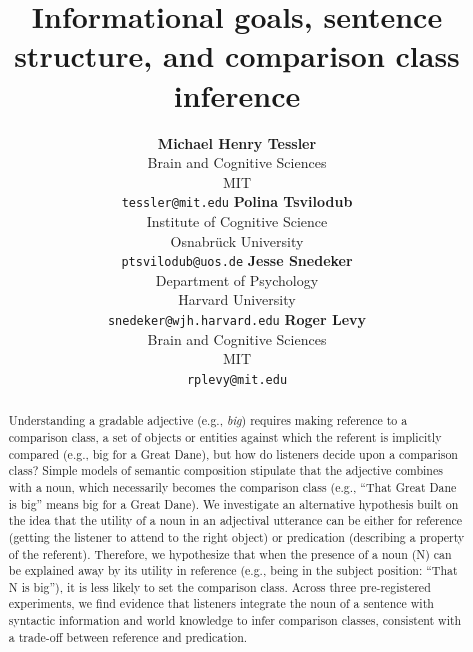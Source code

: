\documentclass[10pt,letterpaper]{article}
\title{Informational goals, sentence structure, and comparison class inference}
\author{{\large \bf Michael Henry Tessler}  \\  Brain and Cognitive Sciences \\   MIT  \\  \texttt{tessler@mit.edu}
         \And  
         {\large \bf Polina Tsvilodub}  \\ Institute of Cognitive Science \\   Osnabrück University  \\  \texttt{ptsvilodub@uos.de}
          \And
         {\large \bf Jesse Snedeker}  \\ Department of Psychology \\   Harvard University  \\  \texttt{snedeker@wjh.harvard.edu}
                   \And
         {\large \bf Roger Levy} \\ Brain and Cognitive Sciences \\   MIT  \\  \texttt{rplevy@mit.edu}}
\begin{document}
\maketitle

\begin{abstract}
   
Understanding a gradable adjective (e.g., \emph{big}) requires making reference to a comparison class, a set of objects or entities against which the referent is implicitly compared (e.g., big for a Great Dane), but how do listeners decide upon a comparison class? Simple models of semantic composition stipulate that the adjective combines with a noun, which necessarily becomes the comparison class (e.g., ``That Great Dane is big'' means big for a Great Dane). We investigate an alternative hypothesis built on the idea that the utility of a noun in an adjectival utterance can be either for reference (getting the listener to attend to the right object) or predication (describing a property of the referent). Therefore, we hypothesize that when the presence of a noun (N) can be explained away by its utility in reference (e.g., being in the subject position: ``That N is big''), it is less likely to set the comparison class. Across three pre-registered experiments, we find evidence that listeners integrate the noun of a sentence with syntactic information and world knowledge to infer comparison classes, consistent with a trade-off between reference and predication. 
 
   
   
\end{abstract}
\end{document}
